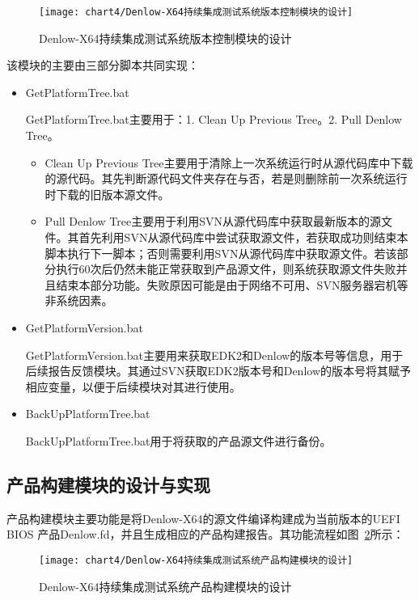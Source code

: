 		\begin{figure}[H] %
			\centering
			\texttt{[image: chart4/Denlow-X64持续集成测试系统版本控制模块的设计]}
			\caption{Denlow-X64持续集成测试系统版本控制模块的设计}
			\label{fig:Denlow-X64持续集成测试系统版本控制模块的设计}
		\end{figure}
		
		该模块的主要由三部分脚本共同实现：
		
		\begin{itemize}
			\item GetPlatformTree.bat
			
				GetPlatformTree.bat主要用于：1. Clean Up Previous Tree。2. Pull Denlow Tree。
				\begin{itemize}
					\item Clean Up Previous Tree主要用于清除上一次系统运行时从源代码库中下载的源代码。其先判断源代码文件夹存在与否，若是则删除前一次系统运行时下载的旧版本源文件。
					\item Pull Denlow Tree主要用于利用SVN从源代码库中获取最新版本的源文件。其首先利用SVN从源代码库中尝试获取源文件，若获取成功则结束本脚本执行下一脚本；否则需要利用SVN从源代码库中获取源文件。若该部分执行60次后仍然未能正常获取到产品源文件，则系统获取源文件失败并且结束本部分功能。失败原因可能是由于网络不可用、SVN服务器宕机等非系统因素。
				\end{itemize}
			\item GetPlatformVersion.bat
			
				GetPlatformVersion.bat主要用来获取EDK2和Denlow的版本号等信息，用于后续报告反馈模块。其通过SVN获取EDK2版本号和Denlow的版本号将其赋予相应变量，以便于后续模块对其进行使用。
			\item BackUpPlatformTree.bat
			
				BackUpPlatformTree.bat用于将获取的产品源文件进行备份。
		\end{itemize}
	
	\subsection{产品构建模块的设计与实现}
		
		产品构建模块主要功能是将Denlow-X64的源文件编译构建成为当前版本的UEFI BIOS 产品Denlow.fd，并且生成相应的产品构建报告。其功能流程如图~\ref{fig:Denlow-X64持续集成测试系统产品构建模块的设计}所示：
		
		\begin{figure}[H] %
			\centering
			\texttt{[image: chart4/Denlow-X64持续集成测试系统产品构建模块的设计]}
			\caption{Denlow-X64持续集成测试系统产品构建模块的设计}
			\label{fig:Denlow-X64持续集成测试系统产品构建模块的设计}
		\end{figure}
		
